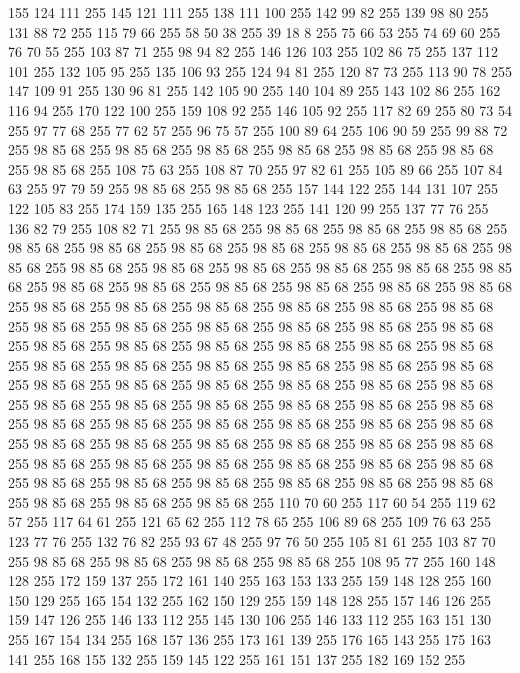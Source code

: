 155 124 111 255 145 121 111 255 138 111 100 255 142 99 82 255 139 98 80 255 131 88 72 255 115 79 66 255 58 50 38 255 39 18 8 255 75 66 53 255 74 69 60 255 76 70 55 255 103 87 71 255 98 94 82 255 146 126 103 255 102 86 75 255 137 112 101 255 132 105 95 255 135 106 93 255 124 94 81 255 120 87 73 255 113 90 78 255 147 109 91 255 130 96 81 255 142 105 90 255 140 104 89 255 143 102 86 255 162 116 94 255 170 122 100 255 159 108 92 255 146 105 92 255 117 82 69 255 80 73 54 255 97 77 68 255 77 62 57 255 96 75 57 255 100 89 64 255 106 90 59 255 99 88 72 255 98 85 68 255 98 85 68 255 98 85 68 255 98 85 68 255 98 85 68 255 98 85 68 255 98 85 68 255 108 75 63 255 108 87 70 255 97 82 61 255 105 89 66 255 107 84 63 255 97 79 59 255 98 85 68 255 98 85 68 255 157 144 122 255 144 131 107 255 122 105 83 255 174 159 135 255 165 148 123 255 141 120 99 255 137 77 76 255 136 82 79 255 108 82 71 255 98 85 68 255
98 85 68 255 98 85 68 255 98 85 68 255 98 85 68 255 98 85 68 255 98 85 68 255 98 85 68 255 98 85 68 255 98 85 68 255 98 85 68 255 98 85 68 255 98 85 68 255 98 85 68 255 98 85 68 255 98 85 68 255 98 85 68 255 98 85 68 255 98 85 68 255 98 85 68 255 98 85 68 255 98 85 68 255 98 85 68 255 98 85 68 255 98 85 68 255 98 85 68 255 98 85 68 255 98 85 68 255 98 85 68 255 98 85 68 255 98 85 68 255 98 85 68 255 98 85 68 255 98 85 68 255 98 85 68 255 98 85 68 255 98 85 68 255 98 85 68 255 98 85 68 255 98 85 68 255 98 85 68 255 98 85 68 255 98 85 68 255 98 85 68 255 98 85 68 255 98 85 68 255 98 85 68 255 98 85 68 255 98 85 68 255 98 85 68 255 98 85 68 255 98 85 68 255 98 85 68 255 98 85 68 255 98 85 68 255 98 85 68 255 98 85 68 255 98 85 68 255 98 85 68 255 98 85 68 255 98 85 68 255 98 85 68 255 98 85 68 255 98 85 68 255 98 85 68 255
98 85 68 255 98 85 68 255 98 85 68 255 98 85 68 255 98 85 68 255 98 85 68 255 98 85 68 255 98 85 68 255 98 85 68 255 98 85 68 255 98 85 68 255 98 85 68 255 98 85 68 255 98 85 68 255 98 85 68 255 98 85 68 255 98 85 68 255 98 85 68 255 98 85 68 255 98 85 68 255 98 85 68 255 110 70 60 255 117 60 54 255 119 62 57 255 117 64 61 255 121 65 62 255 112 78 65 255 106 89 68 255 109 76 63 255 123 77 76 255 132 76 82 255 93 67 48 255 97 76 50 255 105 81 61 255 103 87 70 255 98 85 68 255 98 85 68 255 98 85 68 255 98 85 68 255 108 95 77 255 160 148 128 255 172 159 137 255 172 161 140 255 163 153 133 255 159 148 128 255 160 150 129 255 165 154 132 255 162 150 129 255 159 148 128 255 157 146 126 255 159 147 126 255 146 133 112 255 145 130 106 255 146 133 112 255 163 151 130 255 167 154 134 255 168 157 136 255 173 161 139 255 176 165 143 255 175 163 141 255 168 155 132 255 159 145 122 255 161 151 137 255 182 169 152 255
